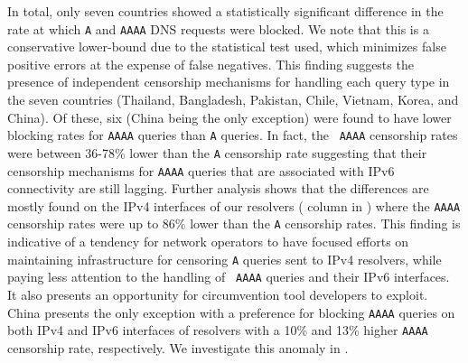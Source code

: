 %
In total, only seven countries showed a statistically significant difference
in the rate at which {\tt A} and {\tt AAAA} DNS requests were blocked. We note
that this is a conservative lower-bound due to the statistical test used, which
minimizes false positive errors at the expense of false negatives.
%
This finding suggests the presence of independent censorship mechanisms for
handling each query type in the seven countries (Thailand, Bangladesh,
Pakistan, Chile, Vietnam, Korea, and China).
%
Of these, six (China being the only exception) were found to have lower
blocking rates for {\tt AAAA} queries than {\tt A} queries. In fact, the {\tt
AAAA} censorship rates were between 36-78\% lower than the {\tt A} censorship
rate suggesting that their censorship mechanisms for {\tt AAAA} queries that
are associated with IPv6 connectivity are still lagging. 
%
Further analysis shows that the differences are mostly found on the IPv4
interfaces of our resolvers ( column in
) where the {\tt AAAA} censorship rates were up to
86\% lower than the {\tt A} censorship rates. 
%
This finding is indicative of a tendency for network operators to have
focused efforts on maintaining infrastructure for censoring {\tt A} queries
sent to IPv4 resolvers, while paying less attention to the handling of {\tt
AAAA} queries and their IPv6 interfaces. It also presents an opportunity for
circumvention tool developers to exploit.
%
China presents the only exception with a preference for blocking
{\tt AAAA} queries on both IPv4 and IPv6 interfaces of resolvers with a 10\%
and 13\% higher {\tt AAAA} censorship rate, respectively. We investigate this
anomaly in .

